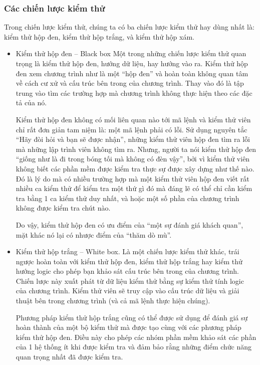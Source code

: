 	\subsubsection{Các chiến lược kiểm thử}
	Trong chiến lược kiểm thử, chúng ta có ba chiến lược kiểm thử hay dùng nhất là: kiểm thử hộp đen, kiểm thử hộp trắng, và kiểm thử hộp xám.
	\begin{itemize}
		\item Kiểm thử hộp đen – Black box
		Một trong những chiến lược kiểm thử quan trọng là kiểm thử hộp đen, hướng dữ liệu, hay hướng vào ra. Kiểm thử hộp đen xem chương trình như là một “hộp đen” và hoàn toàn không quan tâm về cách cư xử và cấu trúc bên trong của chương trình. Thay vào đó là tập trung vào tìm các trường hợp mà chương trình không thực hiện theo các đặc tả của nó.
		
		Kiểm thử hộp đen không có mối liên quan nào tới mã lệnh và kiểm thử viên chỉ rất đơn giản tam niệm là: một mã lệnh phải có lỗi. Sử dụng nguyên tắc “Hãy đòi hỏi và bạn sẽ được nhận”, những kiểm thử viên hộp đen tìm ra lỗi mà những lập trình viên không tìm ra. Nhưng, người ta nói kiểm thử hộp đen “giống như là đi trong bóng tối mà không có đèn vậy”, bởi vì kiểm thử viên không biết các phần mềm được kiểm tra thực sự được xây dựng như thế nào. Đó là lý do mà có nhiều trường hợp mà một kiểm thử viên hộp đen viết rất nhiều ca kiểm thử để kiểm tra một thứ gì đó mà đáng lẽ có thể chỉ cần kiểm tra bằng 1 ca kiểm thử duy nhất, và hoặc một số phần của chương trình không được kiểm tra chút nào.
		
		Do vậy, kiểm thử hộp đen có ưu điểm của “một sự đánh giá khách quan”, mặt khác nó lại có nhược điểm của “thăm dò mù”.
		
		\item Kiểm thử hộp trắng – White box.
		Là một chiến lược kiểm thử khác, trái ngược hoàn toàn với kiểm thử hộp đen, kiểm thử hộp trắng hay kiểm thử hướng logic cho phép bạn khảo sát cấu trúc bên trong của chương trình. Chiến lược này xuất phát từ dữ liệu kiểm thử bằng sự kiểm thử tính logic của chương trình. Kiểm thử viên sẽ truy cập vào cấu trúc dữ liệu và giải thuật bên trong chương trình (và cả mã lệnh thực hiện chúng).
		
		Phương pháp kiểm thử hộp trắng cũng có thể được sử dụng để đánh giá sự hoàn thành của một bộ kiểm thử mà được tạo cùng với các phương pháp kiểm thử hộp đen. Điều này cho phép các nhóm phần mềm khảo sát các phần của 1 hệ thống ít khi được kiểm tra và đảm bảo rằng những điểm chức năng quan trọng nhất đã được kiểm tra.
		

\end{itemize}
